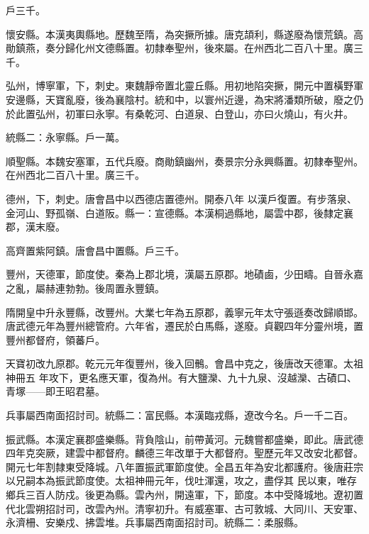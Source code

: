 \begin{pinyinscope}
 戶三千。



 懷安縣。本漢夷輿縣地。歷魏至隋，為突撅所據。唐克頡利，縣遂廢為懷荒鎮。高勛鎮燕，奏分歸化州文德縣置。初隸奉聖州，後來屬。在州西北二百八十里。廣三千。



 弘州，博寧軍，下，刺史。東魏靜帝置北靈丘縣。用初地陷突撅，開元中置橫野軍安邊縣，天寶亂廢，後為襄陰村。統和中，以寰州近邊，為宋將潘類所破，廢之仍於此置弘州，初軍曰永寧。有桑乾河、白道泉、白登山，亦曰火燒山，有火井。



 統縣二：永寧縣。戶一萬。



 順聖縣。本魏安塞軍，五代兵廢。商勛鎮幽州，奏景宗分永興縣置。初隸奉聖州。在州西北二百八十里。廣三千。



 德州，下，刺史。唐會昌中以西德店置德州。開泰八年
 以漢戶復置。有步落泉、金河山、野孤嶺、白道阪。縣一：宣德縣。本漢桐過縣地，屬雲中郡，後隸定襄郡，漢末廢。



 高齊置紫阿鎮。唐會昌中置縣。戶三千。



 豐州，天德軍，節度使。秦為上郡北境，漢屬五原郡。地磧鹵，少田疇。自晉永嘉之亂，屬赫連勃勃。後周置永豐鎮。



 隋開皇中升永豐縣，改豐州。大業七年為五原郡，義寧元年太守張遜奏改歸順邯。唐武德元年為豐州總管府。六年省，遷民於白馬縣，遂廢。貞觀四年分靈州境，置豐州都督府，領蕃戶。



 天寶初改九原郡。乾元元年復豐州，後入回鶻。會昌中克之，後唐改天德軍。太祖神冊五
 年攻下，更名應天軍，復為州。有大鹽灤、九十九泉、沒越灤、古磧口、青塚——即王昭君墓。



 兵事屬西南面招討司。統縣二：富民縣。本漢臨戎縣，遼改今名。戶一千二百。



 振武縣。本漢定襄郡盛樂縣。背負陰山，前帶黃河。元魏嘗都盛樂，即此。唐武德四年克突厥，建雲中都督府。麟德三年改單于大都督府。聖歷元年又改安北都督。開元七年割隸東受降城。八年置振武軍節度使。全昌五年為安北都護府。後唐莊宗以兄嗣本為振武節度使。太祖神冊元年，伐吐渾還，攻之，盡俘其
 民以東，唯存鄉兵三百人防戍。後更為縣。雲內州，開遠軍，下，節度。本中受降城地。遼初置代北雲朔招討司，改雲內州。清寧初升。有威塞軍、古可敦城、大同川、天安軍、永濟柵、安樂戍、拂雲堆。兵事屬西南面招討司。統縣二：柔服縣。




\end{pinyinscope}
